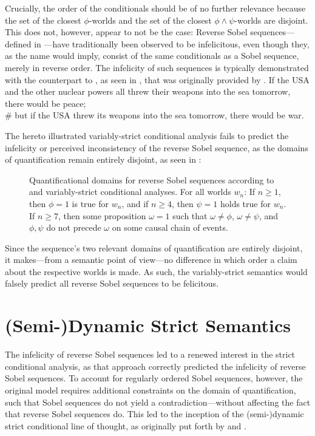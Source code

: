 Crucially, the order of the conditionals should be of no further relevance because the set of the closest $\phi$-worlds and the set of the closest $\phi\land\psi$-worlds are disjoint. This does not, however, appear to not be the case: Reverse Sobel sequences---defined in ---have traditionally been observed to be infelicitous, even though they, as the name would imply, consist of the same conditionals as a Sobel sequence, merely in reverse order. The infelicity of such sequences is typically demonstrated with the counterpart to , as seen in , that was originally provided by \textcite{Heim1994}.
\ex{}\xe
\ex{}If the USA and the other nuclear powers all threw their weapons into the sea tomorrow, there would be peace;\\\ljudge\# but if the USA threw its weapons into the sea tomorrow, there would be war.\\\emptyfill\parencite{Heim1994}
\xe

The hereto illustrated variably-strict conditional analysis fails to predict the infelicity or perceived inconsistency of the reverse Sobel sequence, as the domains of quantification remain entirely disjoint, as seen in :
\begin{figure}[!htb]
%
\caption{Quantificational domains for reverse Sobel sequences according to \textcite{Stalnaker1968} and  variably-strict conditional analyses. For all worlds $w_n$: If $n\geqslant1$, then $\phi=1$ is true for $w_n$, and if $n\geqslant 4$, then $\psi=1$ holds true for $w_n$. If $n\geqslant 7$, then some proposition $\omega=1$ such that $\omega\neq\phi$, $\omega\neq\psi$, and $\phi,\psi$ do not precede $\omega$ on some causal chain of events.}
\end{figure}

\noindent Since the sequence's two relevant domains of quantification are entirely disjoint, it makes---from a semantic point of view---no difference in which order a claim about the respective worlds is made. As such, the variably-strict semantics would falsely predict all reverse Sobel sequences to be felicitous.\vfill
\section{(Semi-)Dynamic Strict Semantics}
The infelicity of reverse Sobel sequences led to a renewed interest in the strict conditional analysis, as that approach correctly predicted the infelicity of reverse Sobel sequences. To account for regularly ordered Sobel sequences, however, the original model requires additional constraints on the domain of quantification, such that Sobel sequences do not yield a contradiction---without affecting the fact that reverse Sobel sequences do. This led to the inception of the (semi-)dynamic strict conditional line of thought, as originally put forth by \textcite{Fintel2001} and \textcite{Gillies2007}. 

